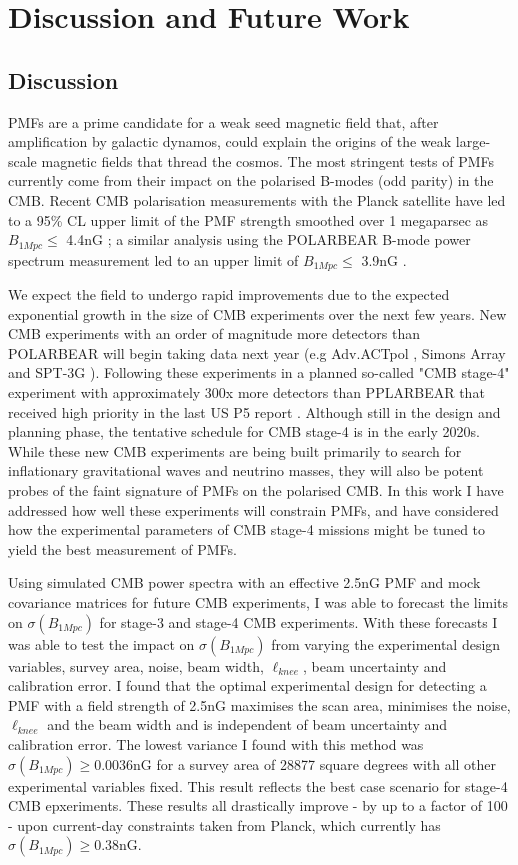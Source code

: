 \section{Discussion and Future Work}
\subsection{Discussion}

PMFs are a prime candidate for a weak seed magnetic field that, after amplification by galactic dynamos, could explain the origins of the weak large-scale magnetic fields that thread the cosmos. The most stringent tests of PMFs currently come from their impact on the polarised B-modes (odd parity) in the CMB. Recent CMB polarisation measurements with the Planck satellite have led to a 95\% CL upper limit of the PMF strength smoothed over 1 megaparsec as $B_{1Mpc} \leq$ 4.4nG \cite{Ade:2015cva}; a similar analysis using the POLARBEAR B-mode power spectrum measurement led to an upper limit of $B_{1Mpc} \leq$ 3.9nG \cite{Ade:2015cao}.

We expect the field to undergo rapid improvements due to the expected exponential growth in the size of CMB experiments over the next few years. New CMB experiments with an order of magnitude more detectors than POLARBEAR will begin taking data next year (e.g Adv.ACTpol \cite{Henderson:2015nzj}, Simons Array \cite{Suzuki:2015zzg} and SPT-3G \cite{Benson:2014qhw}). Following these experiments in a planned so-called "CMB stage-4" experiment with approximately 300x more detectors than PPLARBEAR that received high priority in the last US P5 report \cite{p5}.
Although still in the design and planning phase, the tentative schedule for CMB stage-4 is in the early 2020s. While these new CMB experiments are being built primarily to search for inflationary gravitational waves and neutrino masses, they will also be potent probes of the faint signature of PMFs on the polarised CMB. In this work I have addressed how well these experiments will constrain PMFs, and have considered how the experimental parameters of CMB stage-4 missions might be tuned to yield the best measurement of PMFs.

Using simulated CMB power spectra with an effective 2.5nG PMF and mock covariance matrices for future CMB experiments, I was able to forecast the limits on $\sigma(B_{1Mpc})$ for stage-3 and stage-4 CMB experiments. With these forecasts I was able to test the impact on $\sigma(B_{1Mpc})$ from varying the experimental design variables, survey area, noise, beam width, $\ell_{knee}$, beam uncertainty and calibration error. I found that the optimal experimental design for detecting a PMF with a field strength of 2.5nG maximises the scan area, minimises the noise, $\ell_{knee}$ and the beam width and is independent of beam uncertainty and calibration error. The lowest variance I found with this method was $\sigma(B_{1Mpc}) \geq 0.0036$nG for a survey area of 28877 square degrees with all other experimental variables fixed. This result reflects the best case scenario for stage-4 CMB epxeriments. These results all drastically improve - by up to a factor of 100 - upon current-day constraints taken from Planck, which currently has $\sigma(B_{1Mpc}) \geq 0.38$nG.

